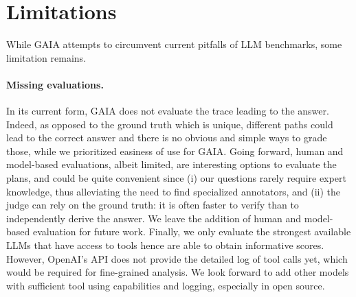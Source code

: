 \documentclass{fairmeta}
\newcommand{\benchmark}{\textsc{GAIA}}
\begin{document}
\vspace{-.3cm}

\section{Limitations} 
\label{sec:limitations}

\vspace{-.2cm}

While \benchmark{} attempts to circumvent current pitfalls of LLM benchmarks, some limitation remains. 

\vspace{-.2cm}

\paragraph{Missing evaluations.} In its current form, \benchmark{} does not evaluate the trace leading to the answer. Indeed, as opposed to the ground truth which is unique, different paths could lead to the correct answer and there is no obvious and simple ways to grade those, while we prioritized easiness of use for \benchmark{}. Going forward, human and model-based evaluations, albeit limited, are interesting options to evaluate the plans, and could be quite convenient since (i) our questions rarely require expert knowledge, thus alleviating the need to find specialized annotators, and (ii) the judge can rely on the ground truth: it is often faster to verify than to independently derive the answer. We leave the addition of human and model-based evaluation for future work. Finally, we only evaluate the strongest available LLMs that have access to tools
hence are able to obtain informative scores. However, OpenAI's API does not provide the detailed log of tool calls yet, which would be required for fine-grained analysis. We look forward to add other models with sufficient tool using capabilities and logging, especially in open source. 

\vspace{-.2cm}
\end{document}
